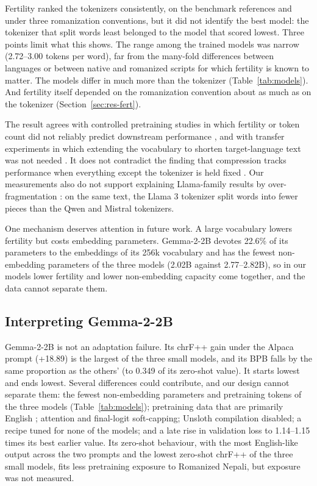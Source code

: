 \documentclass{article}
\begin{document}
Fertility ranked the tokenizers consistently, on the benchmark references and under three romanization conventions, but it did not identify the best model: the tokenizer that split words least belonged to the model that scored lowest. Three points limit what this shows. The range among the trained models was narrow (2.72–3.00 tokens per word), far from the many-fold differences between languages \citep{petrov2023} or between native and romanized scripts \citep{husain2024} for which fertility is known to matter. The models differ in much more than the tokenizer (Table~\ref{tab:models}). And fertility itself depended on the romanization convention about as much as on the tokenizer (Section~\ref{sec:res-fert}).

The result agrees with controlled pretraining studies in which fertility or token count did not reliably predict downstream performance \citep{ali2024,schmidt2024}, and with transfer experiments in which extending the vocabulary to shorten target-language text was not needed \citep{zhao2024}. It does not contradict the finding that compression tracks performance when everything except the tokenizer is held fixed \citep{goldman2024}. Our measurements also do not support explaining Llama-family results by over-fragmentation \citep{rimal2026}: on the same text, the Llama 3 tokenizer split words into fewer pieces than the Qwen and Mistral tokenizers.

One mechanism deserves attention in future work. A large vocabulary lowers fertility but costs embedding parameters. Gemma-2-2B devotes 22.6\% of its parameters to the embeddings of its 256k vocabulary and has the fewest non-embedding parameters of the three models (2.02B against 2.77–2.82B), so in our models lower fertility and lower non-embedding capacity come together, and the data cannot separate them.

\subsection{Interpreting Gemma-2-2B}

Gemma-2-2B is not an adaptation failure. Its chrF++ gain under the Alpaca prompt (+18.89) is the largest of the three small models, and its BPB falls by the same proportion as the others' (to 0.349 of its zero-shot value). It starts lowest and ends lowest. Several differences could contribute, and our design cannot separate them: the fewest non-embedding parameters and pretraining tokens of the three models (Table~\ref{tab:models}); pretraining data that are primarily English \citep{gemma2024}; attention and final-logit soft-capping; Unsloth compilation disabled; a recipe tuned for none of the models; and a late rise in validation loss to 1.14–1.15 times its best earlier value. Its zero-shot behaviour, with the most English-like output across the two prompts and the lowest zero-shot chrF++ of the three small models, fits less pretraining exposure to Romanized Nepali, but exposure was not measured.
\end{document}
